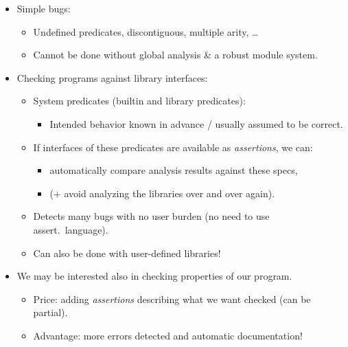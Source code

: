 \documentclass{article}
\renewcommand{\_}{\char'137}
\begin{document}
\begin{itemize}
\item Simple bugs:
  \begin{itemize}
  \item Undefined predicates, discontiguous, multiple arity, \ldots
  \item Cannot be done without global analysis \& a robust module system.
  \end{itemize}
\item Checking programs against library interfaces:
  \begin{itemize}
  \item System predicates (builtin and library predicates):
    \begin{itemize}
    \item Intended behavior known in advance / usually assumed to be correct. 
    \end{itemize}
  
\item If interfaces of these predicates are available as \emph{assertions}, 
we can:
  \begin{itemize}
  \item automatically compare analysis results against these specs,
  \item (+ avoid analyzing the libraries over and over again). 
  \end{itemize}

\item Detects many bugs with no user burden (no need to use
  assert.\ language).
\item Can also be done with user-defined libraries!
\end{itemize}

\item We may be interested also in checking properties of our program.
  \begin{itemize}
  \item Price: adding {\em assertions} describing what we want checked
    (can be partial).

  \item Advantage: more errors detected and automatic documentation! 
\end{itemize}
\end{itemize}
\end{document}
